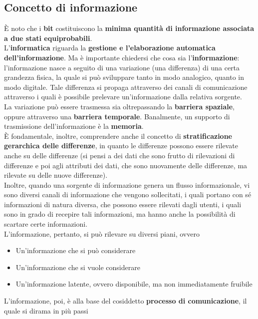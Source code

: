 \documentclass[a4paper]{extarticle}
\begin{document}
\subsection{Concetto di informazione}
È noto che i \textbf{bit} costituiscono la \textbf{minima quantità di informazione associata a due stati equiprobabili}.\\
L'\textbf{informatica} riguarda la \textbf{gestione e l'elaborazione automatica dell'informazione}. Ma è importante chiedersi che cosa sia l'\textbf{informazione}: l'informazione nasce a seguito di una variazione (una differenza) di una certa grandezza fisica, la quale si può sviluppare tanto in modo analogico, quanto in modo digitale. Tale differenza si propaga attraverso dei canali di comunicazione attraverso i quali è possibile prelevare un'informazione dalla relativa sorgente.\\
La variazione può essere trasmessa sia oltrepassando la \textbf{barriera spaziale}, oppure attraverso una \textbf{barriera temporale}. Banalmente, un supporto di trasmissione dell'informazione è la \textbf{memoria}.\\
È fondamentale, inoltre, comprendere anche il concetto di \textbf{stratificazione gerarchica delle differenze}, in quanto le differenze possono essere rilevate anche su delle differenze (si pensi a dei dati che sono frutto di rilevazioni di differenze e poi agli attributi dei dati, che sono nuovamente delle differenze, ma rilevate su delle nuove differenze).\\
Inoltre, quando una sorgente di informazione genera un flusso informazionale, vi sono diversi canali di informazione che vengono sollecitati, i quali portano con sé informazioni di natura diversa, che possono essere rilevati dagli utenti, i quali sono in grado di recepire tali informazioni, ma hanno anche la possibilità di scartare certe informazioni.\\
L'informazione, pertanto, si può rilevare su diversi piani, ovvero
\begin{itemize}
    \item Un'informazione che si può considerare
    \item Un'informazione che si vuole considerare
    \item Un'informazione latente, ovvero disponibile, ma non immediatamente fruibile
\end{itemize}
L'informazione, poi, è alla base del cosiddetto \textbf{processo di comunicazione}, il quale si dirama in più passi
\end{document}
